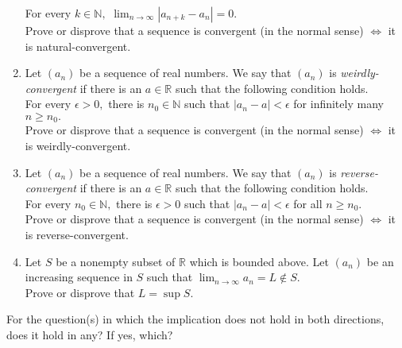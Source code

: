 \documentclass{article}
\begin{document}
\begin{enumerate}
	For every $k \in \mathbb{N},$ $\displaystyle\lim_{n\to \infty}|a_{n+k} - a_n| = 0.$\\
	Prove or disprove that a sequence is convergent (in the normal sense) $\iff$ it is natural-convergent.
	\item Let $(a_n)$ be a sequence of real numbers. We say that $(a_n)$ is \emph{weirdly-convergent} if there is an $a \in \mathbb{R}$ such that the following condition holds.\\
	For every $\epsilon > 0,$ there is $n_0 \in \mathbb{N}$ such that $|a_n - a| < \epsilon$ for infinitely many $n \ge n_0.$\\
	Prove or disprove that a sequence is convergent (in the normal sense) $\iff$ it is weirdly-convergent.
	\item Let $(a_n)$ be a sequence of real numbers. We say that $(a_n)$ is \emph{reverse-convergent} if there is an $a \in \mathbb{R}$ such that the following condition holds.\\
	For every $n_0 \in \mathbb{N},$ there is $\epsilon > 0$ such that $|a_n - a| < \epsilon$ for all $n \ge n_0.$\\
	Prove or disprove that a sequence is convergent (in the normal sense) $\iff$ it is reverse-convergent.
	\item Let $S$ be a nonempty subset of $\mathbb{R}$ which is bounded above. Let $(a_n)$ be an increasing sequence in $S$ such that $\displaystyle\lim_{n\to \infty}a_n = L \not\in S.$\\
	 Prove or disprove that $L = \sup S.$ 
\end{enumerate}
For the question(s) in which the implication does not hold in both directions, does it hold in any? If yes, which?
\end{document}
